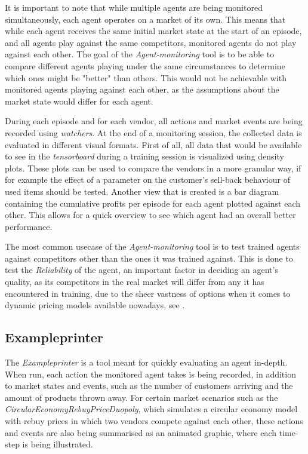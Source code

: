 It is important to note that while multiple agents are being monitored simultaneously, each agent operates on a market of its own. This means that while each agent receives the same initial market state at the start of an episode, and all agents play against the same competitors, monitored agents do not play against each other. The goal of the \emph{Agent-monitoring} tool is to be able to compare different agents playing under the same circumstances to determine which ones might be "better" than others. This would not be achievable with monitored agents playing against each other, as the assumptions about the market state would differ for each agent.

During each episode and for each vendor, all actions and market events are being recorded using \emph{watchers}. At the end of a monitoring session, the collected data is evaluated in different visual formats. First of all, all data that would be available to see in the \emph{tensorboard} during a training session is visualized using density plots. These plots can be used to compare the vendors in a more granular way, if for example the effect of a parameter on the customer's sell-back behaviour of used items should be tested. Another view that is created is a bar diagram containing the cumulative profits per episode for each agent plotted against each other. This allows for a quick overview to see which agent had an overall better performance.

The most common usecase of the \emph{Agent-monitoring} tool is to test trained agents against competitors other than the ones it was trained against. This is done to test the \emph{Reliability} of the agent, an important factor in deciding an agent's quality, as its competitors in the real market will differ from any it has encountered in training, due to the sheer vastness of options when it comes to dynamic pricing models available nowadays, see .
\subsection{Exampleprinter}

The \emph{Exampleprinter} is a tool meant for quickly evaluating an agent in-depth. When run, each action the monitored agent takes is being recorded, in addition to market states and events, such as the number of customers arriving and the amount of products thrown away. For certain market scenarios such as the \emph{CircularEconomyRebuyPriceDuopoly}, which simulates a circular economy model with rebuy prices in which two vendors compete against each other, these actions and events are also being summarised as an animated graphic, where each time-step is being illustrated. 

